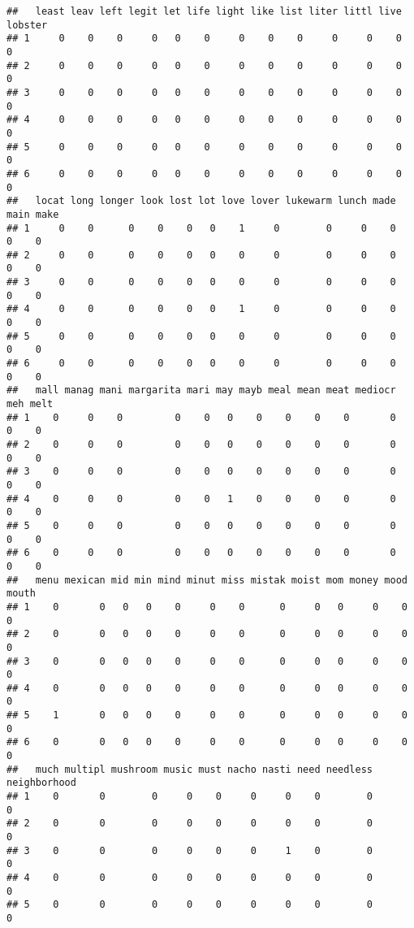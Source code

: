 \documentclass[]{article}
\begin{document}
\begin{verbatim}
##   least leav left legit let life light like list liter littl live lobster
## 1     0    0    0     0   0    0     0    0    0     0     0    0       0
## 2     0    0    0     0   0    0     0    0    0     0     0    0       0
## 3     0    0    0     0   0    0     0    0    0     0     0    0       0
## 4     0    0    0     0   0    0     0    0    0     0     0    0       0
## 5     0    0    0     0   0    0     0    0    0     0     0    0       0
## 6     0    0    0     0   0    0     0    0    0     0     0    0       0
##   locat long longer look lost lot love lover lukewarm lunch made main make
## 1     0    0      0    0    0   0    1     0        0     0    0    0    0
## 2     0    0      0    0    0   0    0     0        0     0    0    0    0
## 3     0    0      0    0    0   0    0     0        0     0    0    0    0
## 4     0    0      0    0    0   0    1     0        0     0    0    0    0
## 5     0    0      0    0    0   0    0     0        0     0    0    0    0
## 6     0    0      0    0    0   0    0     0        0     0    0    0    0
##   mall manag mani margarita mari may mayb meal mean meat mediocr meh melt
## 1    0     0    0         0    0   0    0    0    0    0       0   0    0
## 2    0     0    0         0    0   0    0    0    0    0       0   0    0
## 3    0     0    0         0    0   0    0    0    0    0       0   0    0
## 4    0     0    0         0    0   1    0    0    0    0       0   0    0
## 5    0     0    0         0    0   0    0    0    0    0       0   0    0
## 6    0     0    0         0    0   0    0    0    0    0       0   0    0
##   menu mexican mid min mind minut miss mistak moist mom money mood mouth
## 1    0       0   0   0    0     0    0      0     0   0     0    0     0
## 2    0       0   0   0    0     0    0      0     0   0     0    0     0
## 3    0       0   0   0    0     0    0      0     0   0     0    0     0
## 4    0       0   0   0    0     0    0      0     0   0     0    0     0
## 5    1       0   0   0    0     0    0      0     0   0     0    0     0
## 6    0       0   0   0    0     0    0      0     0   0     0    0     0
##   much multipl mushroom music must nacho nasti need needless neighborhood
## 1    0       0        0     0    0     0     0    0        0            0
## 2    0       0        0     0    0     0     0    0        0            0
## 3    0       0        0     0    0     0     1    0        0            0
## 4    0       0        0     0    0     0     0    0        0            0
## 5    0       0        0     0    0     0     0    0        0            0

\end{verbatim}
\end{document}
